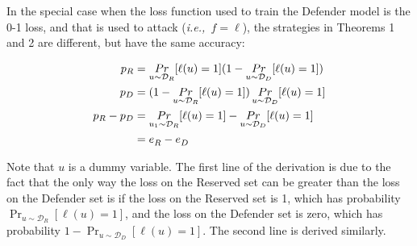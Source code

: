 \documentclass[letterpaper]{article}
\newcommand{\ie}{{\em i.e.,~}}
\begin{document}
In the special case when the loss function used to train the Defender model is the 0-1 loss, and that is used to attack (\ie $f=\ell$), the strategies in Theorems 1 and 2 are different, but have the same accuracy:

\begin{align}
p_R &= \mathop{Pr}_{u \sim \mathcal{D}_R }[\ell(u)=1] (1-\mathop{Pr}_{u \sim \mathcal{D}_D }[\ell(u)=1]) \notag \\
p_D &= (1-\mathop{Pr}_{u \sim \mathcal{D}_R }[\ell(u)=1]) \mathop{Pr}_{u \sim \mathcal{D}_D }[\ell(u)=1] \notag \\
p_R - p_D &= \mathop{Pr}_{u_1 \sim \mathcal{D}_R }[\ell(u)=1] - \mathop{Pr}_{u \sim \mathcal{D}_D }[\ell(u)=1] \notag \\
&= e^{}_R - e^{}_D \notag
\end{align}

Note that $u$ is a dummy variable. The first line of the derivation is due to the fact that the only way the loss on the Reserved set can be greater than the loss on the Defender set is if the loss on the Reserved set is 1, which has probability $\mathop{Pr}_{u \sim \mathcal{D}_R }[\ell(u)=1]$, and the loss on the Defender set is zero, which has probability $1-\mathop{Pr}_{u \sim \mathcal{D}_D }[\ell(u)=1]$. The second line is derived similarly.


\end{document}

